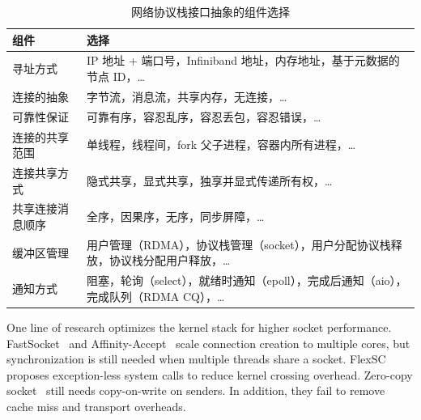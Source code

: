\begin{table}[htbp]
	\centering
	\caption{网络协议栈接口抽象的组件选择}
	\small
	\begin{tabular}{l|p{}}
		\hline
		组件 & 选择 \\
		\hline
		寻址方式 & IP 地址 + 端口号，Infiniband 地址，内存地址，基于元数据的节点 ID，\ldots \\
		连接的抽象 & 字节流，消息流，共享内存，无连接，\ldots \\
		可靠性保证 & 可靠有序，容忍乱序，容忍丢包，容忍错误，\ldots \\
		连接的共享范围 & 单线程，线程间，fork 父子进程，容器内所有进程，\ldots \\
		连接共享方式 & 隐式共享，显式共享，独享并显式传递所有权，\ldots \\
		共享连接消息顺序 & 全序，因果序，无序，同步屏障，\ldots \\
		缓冲区管理 & 用户管理（RDMA），协议栈管理（socket），用户分配协议栈释放，协议栈分配用户释放，\ldots \\
		通知方式 & 阻塞，轮询（select），就绪时通知（epoll），完成后通知（aio），完成队列（RDMA CQ），\ldots \\
		\hline
	\end{tabular}
	\label{socksdirect:tab:api-components}
\end{table}





\iffalse
{}
One line of research optimizes the kernel stack for higher socket performance. FastSocket~\cite{lin2016scalable} and Affinity-Accept~\cite{pesterev2012improving} scale connection creation to multiple cores, but synchronization is still needed when multiple threads share a socket.
FlexSC~\cite{soares2010flexsc} proposes exception-less system calls to reduce kernel crossing overhead.
Zero-copy socket~\cite{thadani1995efficient,chu1996zero} still needs copy-on-write on senders.
In addition, they fail to remove cache miss and transport overheads.



